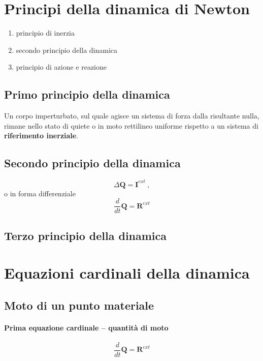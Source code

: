 \section{Principi della dinamica di Newton}
\begin{enumerate}
  \item principio di inerzia
  \item secondo principio della dinamica
  \item principio di azione e reazione
\end{enumerate}
\subsection{Primo principio della dinamica}
Un corpo imperturbato, sul quale agisce un sistema di forza dalla risultante nulla, rimane nello stato di quiete o in moto rettilineo uniforme rispetto a un sistema di \textbf{riferimento inerziale}.

\noindent
{\color{red}{Cosa intendiamo per sistema di riferimento inerziale?}}

\subsection{Secondo principio della dinamica}
\begin{equation}
    \Delta \mathbf{Q} = \mathbf{I}^{ext} \ ,
\end{equation}
o in forma differenziale
\begin{equation}
    \dfrac{d}{dt}\mathbf{Q} = \mathbf{R}^{ext}
\end{equation}

\subsection{Terzo principio della dinamica}

\section{Equazioni cardinali della dinamica}
\subsection{Moto di un punto materiale}
\paragraph{Prima equazione cardinale -- quantità di moto}
\begin{equation}
    \dfrac{d}{dt} \mathbf{Q} = \mathbf{R}^{ext}
\end{equation}

